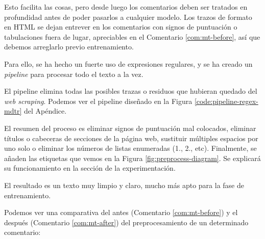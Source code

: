 Esto facilita las cosas, pero desde luego los comentarios deben ser tratados en profundidad antes de poder pasarlos a cualquier modelo. Los trazos de formato en HTML se dejan entrever en los comentarios con signos de puntuación o tabulaciones fuera de lugar, apreciables en el Comentario \ref{com:mt-before}, así que debemos arreglarlo previo entrenamiento.

Para ello, se ha hecho un fuerte uso de expresiones regulares, y se ha creado un \textit{pipeline} para procesar todo el texto a la vez.

El pipeline elimina todas las posibles trazas o residuos que hubieran quedado del \textit{web scraping}. Podemos ver el pipeline diseñado en la Figura \ref{code:pipeline-regex-mdtr} del Apéndice.

El resumen del proceso es eliminar signos de puntuación mal colocados, eliminar títulos o cabeceras de secciones de la página web, sustituir múltiples espacios por uno solo o eliminar los números de listas enumeradas (1., 2., etc). Finalmente, se añaden las etiquetas que vemos en la Figura \ref{fig:preprocess-diagram}. Se explicará su funcionamiento en la sección de la experimentación.

El resultado es un texto muy limpio y claro, mucho más apto para la fase de entrenamiento.

Podemos ver una comparativa del antes (Comentario \ref{com:mt-before}) y el después (Comentario \ref{com:mt-after}) del preprocesamiento de un determinado comentario:


\begin{thm}
	\label{com:mt-before}
\end{thm}


